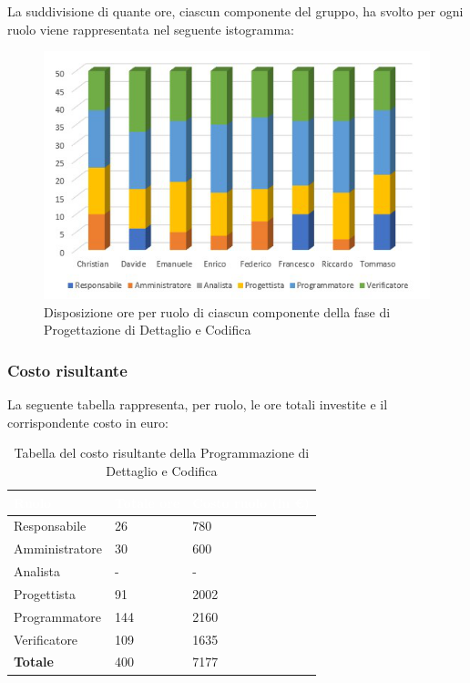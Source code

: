 La suddivisione di quante ore, ciascun componente del gruppo, ha svolto per ogni ruolo viene rappresentata nel seguente istogramma:
\begin{figure}[h!]
\centering
\includegraphics{Sezioni/Istogrammi/IstogrammaDiDettaglio.png}
\caption{Disposizione ore per ruolo di ciascun componente della fase di Progettazione di Dettaglio e Codifica}
\end{figure}

\clearpage

\subsubsection{Costo risultante}
La seguente tabella rappresenta, per ruolo, le ore totali investite e il corrispondente costo in euro:
{
\renewcommand{\arraystretch}{2}
\begin{longtable}{ C{3cm} C{2cm} C{4cm}}
\caption{Tabella del costo risultante della Programmazione di Dettaglio e Codifica}\\

\textcolor{white}{\textbf{Ruolo}} & 
\textcolor{white}{\textbf{Totale ore}} & 
\textcolor{white}{\textbf{Costo ruolo (in \euro{})}}\\	
\endhead
        
Responsabile    &  26 &  780 \\
Amministratore  &  30 &  600 \\
Analista        &   - &    - \\
Progettista     &  91 & 2002 \\
Programmatore   & 144 & 2160 \\
Verificatore    & 109 & 1635 \\
\textbf{Totale} & 400 & 7177 \\
		
\end{longtable}
}

